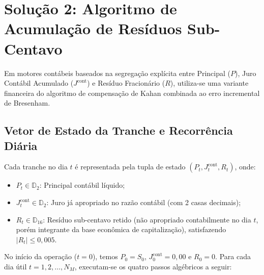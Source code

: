\documentclass[11pt, a4paper]{article}
\begin{document}
\section{Solução 2: Algoritmo de Acumulação de Resíduos Sub-Centavo}

Em motores contábeis baseados na segregação explícita entre Principal ($P$), Juro Contábil Acumulado ($J^{\text{cont}}$) e Resíduo Fracionário ($R$), utiliza-se uma variante financeira do algoritmo de compensação de Kahan combinada ao erro incremental de Bresenham.

\subsection{Vetor de Estado da Tranche e Recorrência Diária}

Cada tranche no dia $t$ é representada pela tupla de estado $(P_t, J_t^{\text{cont}}, R_t)$, onde:
\begin{itemize}
    \item $P_t \in \mathbb{D}_2$: Principal contábil líquido;
    \item $J_t^{\text{cont}} \in \mathbb{D}_2$: Juro já apropriado no razão contábil (com 2 casas decimais);
    \item $R_t \in \mathbb{D}_{16}$: Resíduo sub-centavo retido (não apropriado contabilmente no dia $t$, porém integrante da base econômica de capitalização), satisfazendo $|R_t| \le 0{,}005$.
\end{itemize}

No início da operação ($t=0$), temos $P_0 = S_0$, $J_0^{\text{cont}} = 0{,}00$ e $R_0 = 0$. Para cada dia útil $t = 1, 2, \dots, N_M$, executam-se os quatro passos algébricos a seguir:
\end{document}
